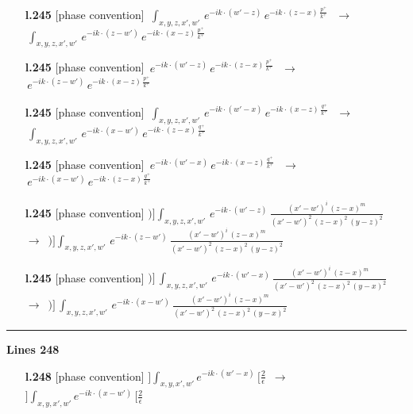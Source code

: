 \documentclass[10pt]{article}
\begin{document}
\begin{itemize}[leftmargin=2.2em,itemsep=1pt,topsep=2pt]
\item[\textbf{l.245}] \textsf{\small [phase convention]} $\displaystyle \,\int_{x,y,z,x',w'}\, e^{-ik\cdot(w'-z)}\,e^{-ik\cdot (z-x)\,\frac{p^{+}}{k^{+}}}\,$\ $\longrightarrow$\ $\displaystyle \,\int_{x,y,z,x',w'}\, e^{-ik\cdot(z-w')}\,e^{-ik\cdot (x-z)\,\frac{p^{+}}{k^{+}}}\,$
\item[\textbf{l.245}] \textsf{\small [phase convention]} $\displaystyle \, e^{-ik\cdot(w'-z)}\,e^{-ik\cdot (z-x)\,\frac{p^{+}}{k^{+}}}\,$\ $\longrightarrow$\ $\displaystyle \, e^{-ik\cdot(z-w')}\,e^{-ik\cdot (x-z)\,\frac{p^{+}}{k^{+}}}\,$
\item[\textbf{l.245}] \textsf{\small [phase convention]} $\displaystyle \, \int_{x,y,z,x',w'}\,e^{-ik\cdot(w'-x)}\,e^{-ik\cdot (x-z)\,\frac{q^{+}}{k^{+}}}\,$\ $\longrightarrow$\ $\displaystyle \, \int_{x,y,z,x',w'}\,e^{-ik\cdot(x-w')}\,e^{-ik\cdot (z-x)\,\frac{q^{+}}{k^{+}}}\,$
\item[\textbf{l.245}] \textsf{\small [phase convention]} $\displaystyle \,e^{-ik\cdot(w'-x)}\,e^{-ik\cdot (x-z)\,\frac{q^{+}}{k^{+}}}\,$\ $\longrightarrow$\ $\displaystyle \,e^{-ik\cdot(x-w')}\,e^{-ik\cdot (z-x)\,\frac{q^{+}}{k^{+}}}\,$
\item[\textbf{l.245}] \textsf{\small [phase convention]} $\displaystyle \Big)\Big] \int_{x,y,z,x',w'}\,e^{-ik\cdot(w'-z)}\, \frac{(x'-w')^{i}\,(z-x)^{m}}{(x'-w')^{2}\,(z-x)^{2}\, (y-z)^{2}}\,$\ $\longrightarrow$\ $\displaystyle \Big)\Big] \int_{x,y,z,x',w'}\,e^{-ik\cdot(z-w')}\, \frac{(x'-w')^{i}\,(z-x)^{m}}{(x'-w')^{2}\,(z-x)^{2}\, (y-z)^{2}}\,$
\item[\textbf{l.245}] \textsf{\small [phase convention]} $\displaystyle )\Big]\, \int_{x,y,z,x',w'}\,e^{-ik\cdot(w'-x)}\,\frac{(x'-w')^{i}\,(z-x)^{m}}{(x'-w')^{2}\,(z-x)^{2}\,(y-x)^{2}}$\ $\longrightarrow$\ $\displaystyle )\Big]\, \int_{x,y,z,x',w'}\,e^{-ik\cdot(x-w')}\,\frac{(x'-w')^{i}\,(z-x)^{m}}{(x'-w')^{2}\,(z-x)^{2}\,(y-x)^{2}}$
\end{itemize}
\noindent\rule{\linewidth}{0.3pt}\par\noindent\textbf{Lines 248} \par
\begin{itemize}[leftmargin=2.2em,itemsep=1pt,topsep=2pt]
\item[\textbf{l.248}] \textsf{\small [phase convention]} $\displaystyle ]\int_{x,y,x',w'}e^{-ik\cdot(w'-x)}\,[\frac{2}{\epsilon}$\ $\longrightarrow$\ $\displaystyle ]\int_{x,y,x',w'}e^{-ik\cdot(x-w')}\,[\frac{2}{\epsilon}$
\end{itemize}
\end{document}

